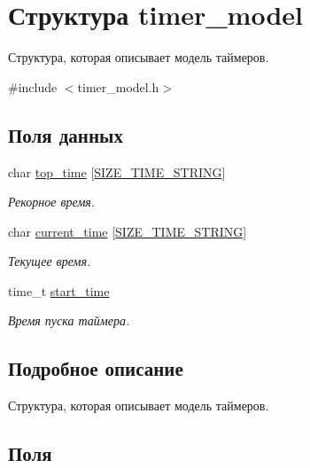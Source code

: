 \hypertarget{structtimer__model}{}\section{Структура timer\+\_\+model}
\label{structtimer__model}


Структура, которая описывает модель таймеров.  




{\ttfamily \#include $<$timer\+\_\+model.\+h$>$}

\subsection*{Поля данных}
\begin{DoxyCompactItemize}
\item 
char \hyperlink{structtimer__model_a02202197b7b11c2d3dde956d875a4c02}{top\+\_\+time} \mbox{[}\hyperlink{timer__model_8h_afb8e0513b4926ca94b38be5d60aaf125}{S\+I\+Z\+E\+\_\+\+T\+I\+M\+E\+\_\+\+S\+T\+R\+I\+NG}\mbox{]}
\begin{DoxyCompactList}\small\item\em Рекорное время. \end{DoxyCompactList}\item 
char \hyperlink{structtimer__model_afe9b325627d97aacb3c7952a788b003f}{current\+\_\+time} \mbox{[}\hyperlink{timer__model_8h_afb8e0513b4926ca94b38be5d60aaf125}{S\+I\+Z\+E\+\_\+\+T\+I\+M\+E\+\_\+\+S\+T\+R\+I\+NG}\mbox{]}
\begin{DoxyCompactList}\small\item\em Текущее время. \end{DoxyCompactList}\item 
time\+\_\+t \hyperlink{structtimer__model_aa78e974af2e5cde082a081c24c7fafc4}{start\+\_\+time}
\begin{DoxyCompactList}\small\item\em Время пуска таймера. \end{DoxyCompactList}\end{DoxyCompactItemize}


\subsection{Подробное описание}
Структура, которая описывает модель таймеров. 

\subsection{Поля}
\mbox{\label{structtimer__model_afe9b325627d97aacb3c7952a788b003f}} 
